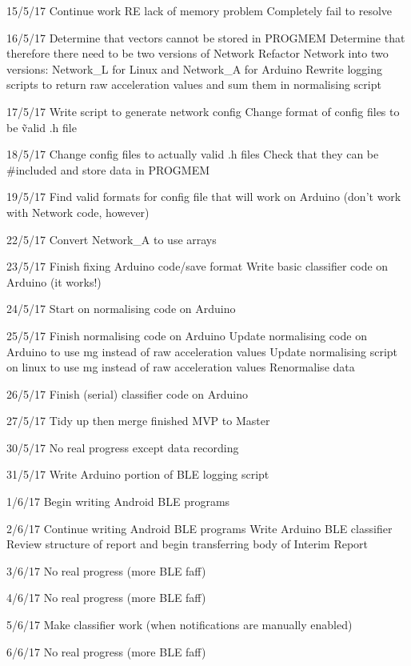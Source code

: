 \documentclass[a4paper]{article}
\begin{document}
15/5/17
    Continue work RE lack of memory problem
    Completely fail to resolve

16/5/17
    Determine that vectors cannot be stored in PROGMEM
    Determine that therefore there need to be two versions of Network
    Refactor Network into two versions: Network\_L for Linux and Network\_A for Arduino
    Rewrite logging scripts to return raw acceleration values and sum them in normalising script

17/5/17
    Write script to generate network config
    Change format of config files to be \~valid .h file

18/5/17
    Change config files to actually valid .h files 
    Check that they can be \#included and store data in PROGMEM

19/5/17
    Find valid formats for config file that will work on Arduino
        (don't work with Network code, however)

22/5/17
    Convert Network\_A to use arrays
     
23/5/17
    Finish fixing Arduino code/save format
    Write basic classifier code on Arduino (it works!)

24/5/17
    Start on normalising code on Arduino

25/5/17
    Finish normalising code on Arduino
    Update normalising code on Arduino to use mg instead of raw acceleration values
    Update normalising script on linux to use mg instead of raw acceleration values
    Renormalise data

26/5/17
    Finish (serial) classifier code on Arduino

27/5/17
    Tidy up then merge finished MVP to Master

30/5/17
    No real progress except data recording

31/5/17
    Write Arduino portion of BLE logging script

1/6/17
    Begin writing Android BLE programs

2/6/17
    Continue writing Android BLE programs
    Write Arduino BLE classifier
    Review structure of report and begin transferring body of Interim Report

3/6/17
    No real progress (more BLE faff)

4/6/17
    No real progress (more BLE faff)

5/6/17
    Make classifier work (when notifications are manually enabled)

6/6/17
    No real progress (more BLE faff)
\end{document}
